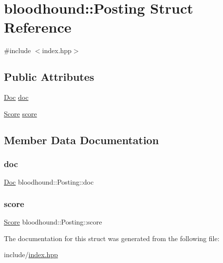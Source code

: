 \hypertarget{structbloodhound_1_1Posting}{}\section{bloodhound\+:\+:Posting Struct Reference}
\label{structbloodhound_1_1Posting}


{\ttfamily \#include $<$index.\+hpp$>$}

\subsection*{Public Attributes}
\begin{DoxyCompactItemize}
\item 
\hyperlink{structbloodhound_1_1Doc}{Doc} \hyperlink{structbloodhound_1_1Posting_ae39f120507b708385e754c693109e384}{doc}
\item 
\hyperlink{structbloodhound_1_1Score}{Score} \hyperlink{structbloodhound_1_1Posting_afcdc4c2d2486c04feee39077122e1622}{score}
\end{DoxyCompactItemize}


\subsection{Member Data Documentation}
\mbox{\label{structbloodhound_1_1Posting_ae39f120507b708385e754c693109e384}} 
\subsubsection{\texorpdfstring{doc}{doc}}
{\footnotesize\ttfamily \hyperlink{structbloodhound_1_1Doc}{Doc} bloodhound\+::\+Posting\+::doc}

\mbox{\label{structbloodhound_1_1Posting_afcdc4c2d2486c04feee39077122e1622}} 
\subsubsection{\texorpdfstring{score}{score}}
{\footnotesize\ttfamily \hyperlink{structbloodhound_1_1Score}{Score} bloodhound\+::\+Posting\+::score}



The documentation for this struct was generated from the following file\+:\begin{DoxyCompactItemize}
\item 
include/\hyperlink{index_8hpp}{index.\+hpp}\end{DoxyCompactItemize}
